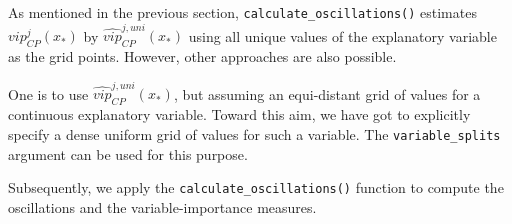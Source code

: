\documentclass[12pt,]{krantz}
\newenvironment{Shaded}{\begin{snugshade}}{\end{snugshade}}
\newcommand{\DataTypeTok}[1]{\textcolor[rgb]{0.13,0.29,0.53}{#1}}
\newcommand{\DecValTok}[1]{\textcolor[rgb]{0.00,0.00,0.81}{#1}}
\newcommand{\FloatTok}[1]{\textcolor[rgb]{0.00,0.00,0.81}{#1}}
\newcommand{\KeywordTok}[1]{\textcolor[rgb]{0.13,0.29,0.53}{\textbf{#1}}}
\newcommand{\NormalTok}[1]{#1}
\newcommand{\OperatorTok}[1]{\textcolor[rgb]{0.81,0.36,0.00}{\textbf{#1}}}
\newcommand{\StringTok}[1]{\textcolor[rgb]{0.31,0.60,0.02}{#1}}
\begin{document}
As mentioned in the previous section, \texttt{calculate\_oscillations()} estimates \(vip_{CP}^j(x_*)\) by \(\widehat{vip}_{CP}^{j,uni}(x_*)\) using all unique values of the explanatory variable as the grid points. However, other approaches are also possible.

One is to use \(\widehat{vip}_{CP}^{j,uni}(x_*)\), but assuming an equi-distant grid of values for a continuous explanatory variable. Toward this aim, we have got to explicitly specify a dense uniform grid of values for such a variable. The \texttt{variable\_splits} argument can be used for this purpose.

\begin{Shaded}
\end{Shaded}

Subsequently, we apply the \texttt{calculate\_oscillations()} function to compute the oscillations and the variable-importance measures.

\begin{Shaded}
\end{Shaded}
\end{document}
